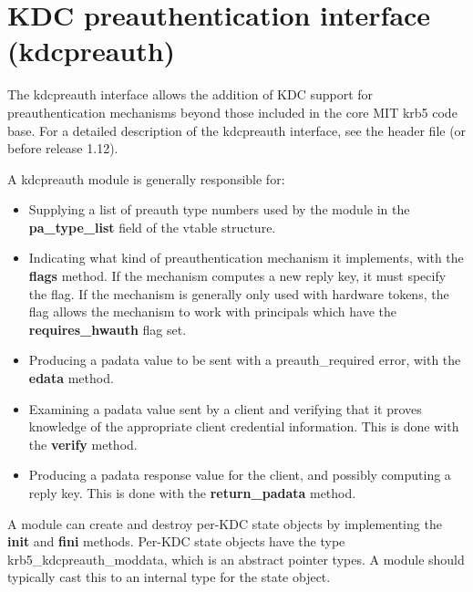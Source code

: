 \documentclass[letterpaper,10pt,english]{sphinxmanual}
\begin{document}
\section{KDC preauthentication interface (kdcpreauth)}
\label{plugindev/kdcpreauth:kdc-preauthentication-interface-kdcpreauth}\label{plugindev/kdcpreauth::doc}
The kdcpreauth interface allows the addition of KDC support for
preauthentication mechanisms beyond those included in the core MIT
krb5 code base.  For a detailed description of the kdcpreauth
interface, see the header file  (or
 before release 1.12).

A kdcpreauth module is generally responsible for:
\begin{itemize}
\item {} 
Supplying a list of preauth type numbers used by the module in the
\textbf{pa\_type\_list} field of the vtable structure.

\item {} 
Indicating what kind of preauthentication mechanism it implements,
with the \textbf{flags} method.  If the mechanism computes a new reply
key, it must specify the  flag.  If the mechanism
is generally only used with hardware tokens, the 
flag allows the mechanism to work with principals which have the
\textbf{requires\_hwauth} flag set.

\item {} 
Producing a padata value to be sent with a preauth\_required error,
with the \textbf{edata} method.

\item {} 
Examining a padata value sent by a client and verifying that it
proves knowledge of the appropriate client credential information.
This is done with the \textbf{verify} method.

\item {} 
Producing a padata response value for the client, and possibly
computing a reply key.  This is done with the \textbf{return\_padata}
method.

\end{itemize}

A module can create and destroy per-KDC state objects by implementing
the \textbf{init} and \textbf{fini} methods.  Per-KDC state objects have the
type krb5\_kdcpreauth\_moddata, which is an abstract pointer types.  A
module should typically cast this to an internal type for the state
object.
\end{document}
